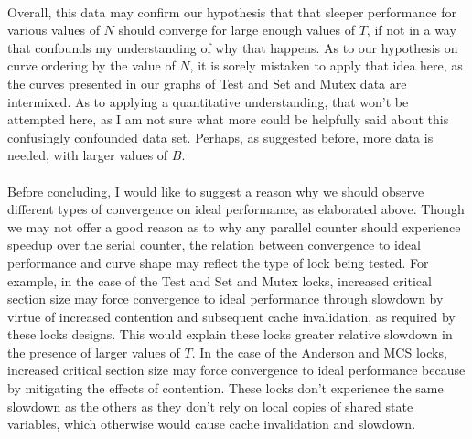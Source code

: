 \documentclass[]{article}
\begin{document}
\\
Overall, this data may confirm our hypothesis that that sleeper performance for various values of $N$ should converge for large enough values of $T$, if not in a way that confounds my understanding of why that happens. As to our hypothesis on curve ordering by the value of $N$, it is sorely mistaken to apply that idea here, as the curves presented in our graphs of Test and Set and Mutex data are intermixed. As to applying a quantitative understanding, that won't be attempted here, as I am not sure what more could be helpfully said about this confusingly confounded data set. Perhaps, as suggested before, more data is needed, with larger values of $B$.
\\\\
Before concluding, I would like to suggest a reason why we should observe different types of convergence on ideal performance, as elaborated above. Though we may not offer a good reason as to why any parallel counter should experience speedup over the serial counter, the relation between convergence to ideal performance and curve shape may reflect the type of lock being tested. For example, in the case of the Test and Set and Mutex locks, increased critical section size may force convergence to ideal performance through slowdown by virtue of increased contention and subsequent cache invalidation, as required by these locks designs. This would explain these locks greater relative slowdown in the presence of larger values of $T$. In the case of the Anderson and MCS locks, increased critical section size may force convergence to ideal performance because by mitigating the effects of contention. These locks don't experience the same slowdown as the others as they don't rely on local copies of shared state variables, which otherwise would cause cache invalidation and slowdown.
\end{document}
